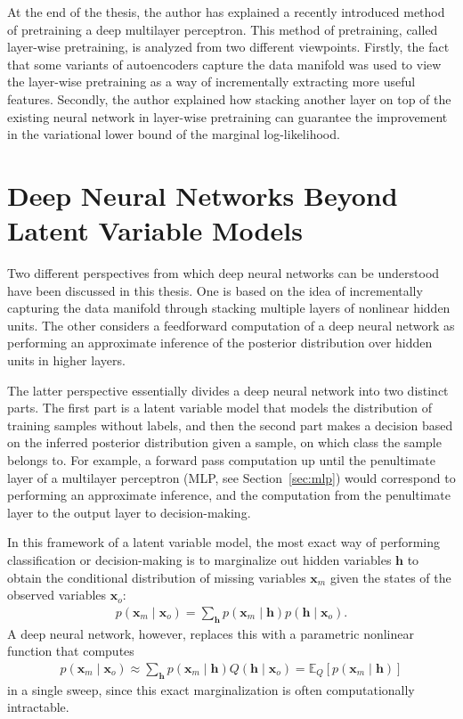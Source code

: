 \documentclass{now}
\newcommand{\vect}[1]{\mathbf{#1}}
\newcommand{\vh}[0]{\vect{h}}
\newcommand{\vx}[0]{\vect{x}}
\newcommand{\E}[0]{\mathbb{E}}
\begin{document}
At the end of the thesis, the author has explained a recently
introduced method of pretraining a deep multilayer
perceptron. This method of pretraining, called layer-wise
pretraining, is analyzed from two different viewpoints.
Firstly, the fact that some variants of autoencoders capture
the data manifold was used to view the layer-wise
pretraining as a way of incrementally extracting more useful
features. Secondly, the author explained how stacking
another layer on top of the existing neural network in 
layer-wise pretraining can guarantee the improvement in the
variational lower bound of the marginal log-likelihood.


\section{Deep Neural Networks Beyond Latent Variable Models}

Two different perspectives from which deep neural networks
can be understood have been discussed in this thesis. One is
based on the idea of incrementally capturing the data manifold
through stacking multiple layers of nonlinear hidden units.
The other considers a feedforward computation of a deep
neural network as performing an approximate inference of the
posterior distribution over hidden units in higher layers.

The latter perspective essentially divides a deep neural
network into two distinct parts. The first part is a latent
variable model that models the distribution of training
samples without labels, and then the second part makes a
decision based on the inferred posterior distribution given
a sample, on which class the sample belongs to. For example,
a forward pass computation up until the penultimate layer of
a multilayer perceptron (MLP, see Section~\ref{sec:mlp})
would correspond to performing an approximate inference, and the
computation from the penultimate layer to the output layer
to decision-making.

In this framework of a latent variable model, the most exact
way of performing classification or decision-making is
to marginalize out hidden variables $\vh$ to obtain the
conditional distribution of missing variables $\vx_m$ given
the states of the observed variables $\vx_o$:
\begin{align*}
    p(\vx_m \mid \vx_o) = \sum_{\vh} p(\vx_m \mid \vh) p(\vh
    \mid \vx_o).
\end{align*}
A deep neural network, however, replaces
this with a parametric nonlinear function that computes
\begin{align*}
    p(\vx_m \mid \vx_o) \approx  
    \sum_{\vh} p(\vx_m \mid
    \vh) Q(\vh \mid \vx_o) 
    = 
    \E_Q\left[p(\vx_m \mid
    \vh )\right]
\end{align*}
in a single sweep, since this exact marginalization is often
computationally intractable.
\end{document}
